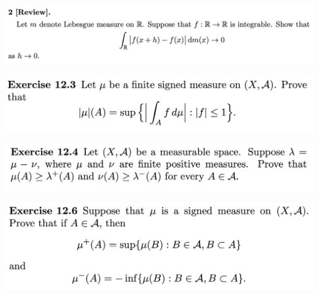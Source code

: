 \newpage
\begin{mdframed}
\includegraphics[width=400pt]{img/analysis--berkeley-202a-hw10-5e9e.png}
\end{mdframed}


\newpage
\begin{mdframed}
\includegraphics[width=400pt]{img/analysis--berkeley-202a-hw10-551e.png}
\end{mdframed}


\newpage
\begin{mdframed}
\includegraphics[width=400pt]{img/analysis--berkeley-202a-hw10-8336.png}
\end{mdframed}

\newpage
\begin{mdframed}
\includegraphics[width=400pt]{img/analysis--berkeley-202a-hw10-0220.png}
\end{mdframed}
